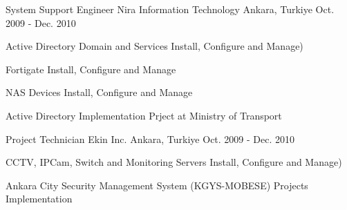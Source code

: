 \begin{cventries}
\cventry
    {System Support Engineer} %
    {Nira Information Technology} %
    {Ankara, Turkiye} %
    {Oct. 2009 - Dec. 2010} %
    {
      \begin{cvitems} %
        \item {Active Directory Domain and Services Install, Configure and Manage)}
        \item {Fortigate Install, Configure and Manage}
        \item {NAS Devices Install, Configure and Manage}
        \item {Active Directory Implementation Prject at Ministry of Transport}
        \end{cvitems} 
    }
 \cventry
    {Project Technician} %
    {Ekin Inc.} %
    {Ankara, Turkiye} %
    {Oct. 2009 - Dec. 2010} %
    {
      \begin{cvitems} %
        \item {CCTV, IPCam, Switch and Monitoring Servers Install, Configure and Manage)}
        \item {Ankara City Security Management System (KGYS-MOBESE) Projects Implementation}
      \end{cvitems} 
    }
\end{cventries}